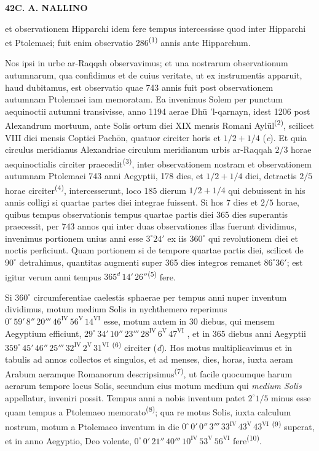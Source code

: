 \documentclass[10pt,a4paper]{article}
\newcommand{\SP}[3]{%
  \clearpage
  \hypertarget{AB01-PDF#1}{}%
  \begin{center}
    \textbf{#2\quad #3}
  \end{center}%
}
\newcommand{\A}[1]{\hypertarget{#1}{}}
\newcommand{\NM}[1]{\textsuperscript{(#1)}}
\newcommand{\SX}[7]{%
  \ensuremath{%
    #1^\circ\,#2'\,#3''\,#4'''\,%
    #5^{\mathrm{IV}}\,#6^{\mathrm{V}}\,#7^{\mathrm{VI}}%
  }%
}
\begin{document}

\SP{0131}{42}{C. A. NALLINO}

\A{AB01-PDF0131-P01}
et observationem Hipparchi idem fere tempus intercessisse quod
inter Hipparchi et Ptolemaei; fuit enim observatio 286\NM{1} annis
ante Hipparchum.

\A{AB01-PDF0131-P02}
Nos ipsi in urbe ar-Raqqah observavimus; et una nostrarum
observationum autumnarum, qua confidimus et de cuius veritate,
ut ex instrumentis apparuit, haud dubitamus, est observatio quae
743 annis fuit post observationem autumnam Ptolemaei iam
memoratam. Ea invenimus Solem per punctum aequinoctii autumni
transivisse, anno 1194 aerae Dhū 'l-qarnayn, idest 1206 post
Alexandrum mortuum, ante Solis ortum diei XIX mensis Romani
Aylūl\NM{2}, scilicet VIII diei mensis Coptici Pachōn, quatuor
circiter horis et $1/2+1/4$ ({\itshape c}). Et quia circulus meridianus
Alexandriae circulum meridianum urbis ar-Raqqah $2/3$ horae
aequinoctialis circiter praecedit\NM{3}, inter observationem nostram
et observationem autumnam Ptolemaei 743 anni Aegyptii, 178 dies,
et $1/2+1/4$ diei, detractis $2/5$ horae circiter\NM{4},
intercesserunt, loco 185 dierum $1/2+1/4$ qui debuissent in his
annis colligi si quartae partes diei integrae fuissent. Si hos
7 dies et $2/5$ horae, quibus tempus observationis tempus
quartae partis diei 365 dies superantis praecessit, per 743 annos
qui inter duas observationes illas fuerunt dividimus, invenimus
portionem unius anni esse $3^\circ24'$ ex iis $360^\circ$ qui
revolutionem diei et noctis perficiunt. Quam portionem si de
tempore quartae partis diei, scilicet de $90^\circ$ detrahimus,
quantitas augmenti super 365 dies integros remanet $86^\circ36'$;
est igitur verum anni tempus $365^{d}\,14'\,26''$\NM{5} fere.

\A{AB01-PDF0131-P03}
Si $360^\circ$ circumferentiae caelestis sphaerae per tempus anni
nuper inventum dividimus, motum medium Solis in nychthemero
reperimus \SX{0}{59}{8}{20}{46}{56}{14} esse, motum autem
in 30 diebus, qui mensem Aegyptium efficiunt,
\SX{29}{34}{10}{23}{28}{6}{47}, et in 365 diebus anni
Aegyptii \SX{359}{45}{46}{25}{32}{2}{31}\NM{6} circiter
({\itshape d}). Hos motus multiplicavimus et in tabulis ad annos collectos
et singulos, et ad menses, dies, horas, iuxta aeram Arabum
aeramque Romanorum descripsimus\NM{7}, ut facile quocumque harum
aerarum tempore locus Solis, secundum eius motum medium qui
{\itshape medium Solis} appellatur, inveniri possit. Tempus anni a nobis
inventum patet $2^\circ1/5$ minus esse quam tempus a Ptolemaeo
memorato\NM{8}; qua re motus Solis, iuxta calculum nostrum,
motum a Ptolemaeo inventum in die
\SX{0}{0}{0}{3}{33}{43}{43}\NM{9} superat, et in anno
Aegyptio, Deo volente,
\SX{0}{0}{21}{40}{10}{53}{56} fere\NM{10}.
\end{document}
